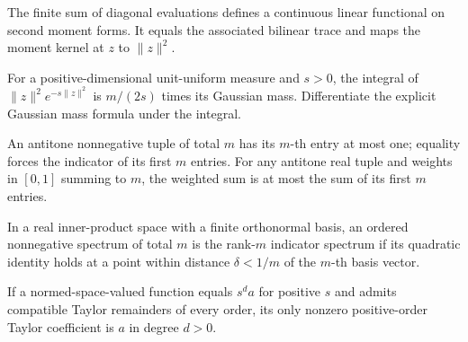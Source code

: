 \begin{lemma}
\label{lem:moment-trace-operator}

The finite sum of diagonal evaluations defines a continuous linear functional on second moment forms. It equals the associated bilinear trace and maps the moment kernel at $z$ to $\lVert z\rVert^2$.
\end{lemma}

\begin{lemma}
\label{lem:gaussian-radial-second-moment}

For a positive-dimensional unit-uniform measure and $s>0$, the integral of $\lVert z\rVert^2e^{-s\lVert z\rVert^2}$ is $m/(2s)$ times its Gaussian mass. Differentiate the explicit Gaussian mass formula under the integral.
\end{lemma}

\begin{lemma}
\label{lem:ordered-trace-bounds}

An antitone nonnegative tuple of total $m$ has its $m$-th entry at most one; equality forces the indicator of its first $m$ entries. For any antitone real tuple and weights in $[0,1]$ summing to $m$, the weighted sum is at most the sum of its first $m$ entries.
\end{lemma}

\begin{lemma}
\label{lem:quadratic-near-basis-rigidity}

In a real inner-product space with a finite orthonormal basis, an ordered nonnegative spectrum of total $m$ is the rank-$m$ indicator spectrum if its quadratic identity holds at a point within distance $\delta<1/m$ of the $m$-th basis vector.
\end{lemma}

\begin{lemma}
\label{lem:exact-monomial-coefficients}

If a normed-space-valued function equals $s^d a$ for positive $s$ and admits compatible Taylor remainders of every order, its only nonzero positive-order Taylor coefficient is $a$ in degree $d>0$.
\end{lemma}

